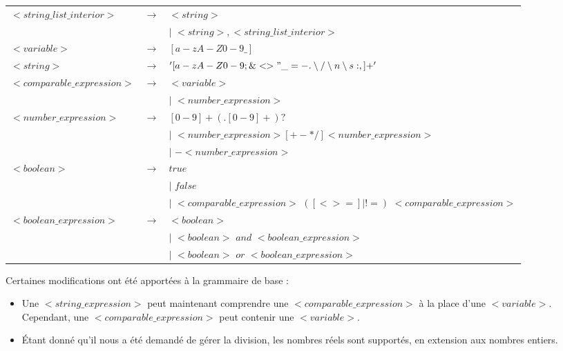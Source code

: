\documentclass[11pt]{article}
\begin{document}
\begin{center}
\begin{tabular}{|lcl|}
$<string\_ list\_ interior>$ 	& $\rightarrow$ 	& $<string>$\\
								&					& $|$ $<string>,<string\_ list\_ interior>$ \\
$<variable>$ 					& $\rightarrow$ 	& $[a-zA-Z0-9\_ ]$\\
$<string>$						& $\rightarrow$		& $'[a-zA-Z0-9;\&<>"\_ =-.\setminus / \setminus n\setminus s:,]+'$\\
$<comparable\_ expression>$ 	& $\rightarrow$		& $<variable>$\\
								&					& $|$ $<number\_ expression>$\\
$<number\_ expression>$ 		& $\rightarrow$ 	& $[0-9]+(.[0-9]+)?$\\
								&					& $|$ $<number\_ expression>[+-*/]<number\_ expression>$\\
								&					& $|$ $-<number\_ expression>$\\
$<boolean>$						& $\rightarrow$ 	& $true$\\
								&					& $|$ $false$\\
								&					& $|$ $<comparable\_ expression>$ $([<>=]|!=)$ $<comparable\_ expression>$\\
$<boolean\_ expression>$ 		& $\rightarrow$ 	& $<boolean>$\\
								&					& $|$ $<boolean>$ $and$ $<boolean\_ expression>$\\
								&					& $|$ $<boolean>$ $or$ $<boolean\_ expression>$\\
\hline
\end{tabular}
\end{center}
Certaines modifications ont été apportées à la grammaire de base :
\begin{itemize}
\item Une $<string\_ expression>$ peut maintenant comprendre une $<comparable\_ expression>$ à la place d'une $<variable>$. Cependant, une $<comparable\_ expression>$ peut contenir une $<variable>$.
\item Étant donné qu'il nous a été demandé de gérer la division, les nombres réels sont supportés, en extension aux nombres entiers.
\end{itemize}

\newpage
\end{document}
